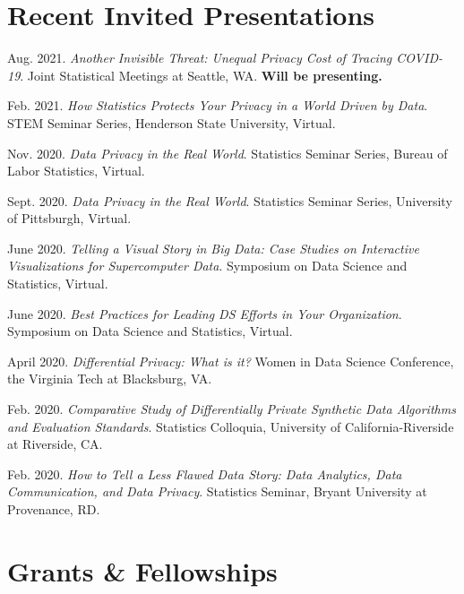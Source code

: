 \documentclass[11.5pt, letterpaper, roman]{moderncv} %
\begin{document}
\section{Recent Invited Presentations}
\begin{etaremune}[topsep=0pt, itemsep=8pt, partopsep=0pt, parsep=0pt]
\smallskip
    \item Aug. 2021. \textit{Another Invisible Threat: Unequal Privacy Cost of Tracing COVID-19}. Joint Statistical Meetings at Seattle, WA. \textbf{Will be presenting.}
    
    \item Feb. 2021. \textit{How Statistics Protects Your Privacy in a World Driven by Data}. STEM Seminar Series, Henderson State University, Virtual.

    \item Nov. 2020. \textit{Data Privacy in the Real World}. Statistics Seminar Series, Bureau of Labor Statistics, Virtual.

    \item Sept. 2020. \textit{Data Privacy in the Real World}. Statistics Seminar Series, University of Pittsburgh, Virtual.

    \item June 2020. \textit{Telling a Visual Story in Big Data: Case Studies on Interactive Visualizations for Supercomputer Data}. Symposium on Data Science and Statistics, Virtual.
  
    \item June 2020. \textit{Best Practices for Leading DS Efforts in Your Organization}. Symposium on Data Science and Statistics, Virtual.  
    
    \item April 2020. \textit{Differential Privacy: What is it?} Women in Data Science Conference, the Virginia Tech at Blacksburg, VA.
    
     \item Feb. 2020. \textit{Comparative Study of Differentially Private Synthetic Data Algorithms and Evaluation Standards}. Statistics Colloquia, University of California-Riverside at Riverside, CA.
  
    \item Feb. 2020. \textit{How to Tell a Less Flawed Data Story: Data Analytics, Data Communication, and Data Privacy}. Statistics Seminar, Bryant University at Provenance, RD.
  
\end{etaremune}

\newpage
\section{Grants \& Fellowships}
    \vspace{4pt}
    
\end{document}
